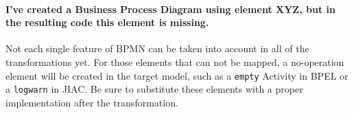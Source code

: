\paragraph*{I've created a Business Process Diagram using element XYZ, but in the resulting code this element is missing.}
Not each single feature of BPMN can be taken into account in all of the transformations yet.  For those elements that can not be mapped, a no-operation element will be created in the target model, such as a \verb|empty| Activity in BPEL or a \verb|logwarn| in JIAC. Be sure to substitute these elements with a proper implementation after the transformation.
